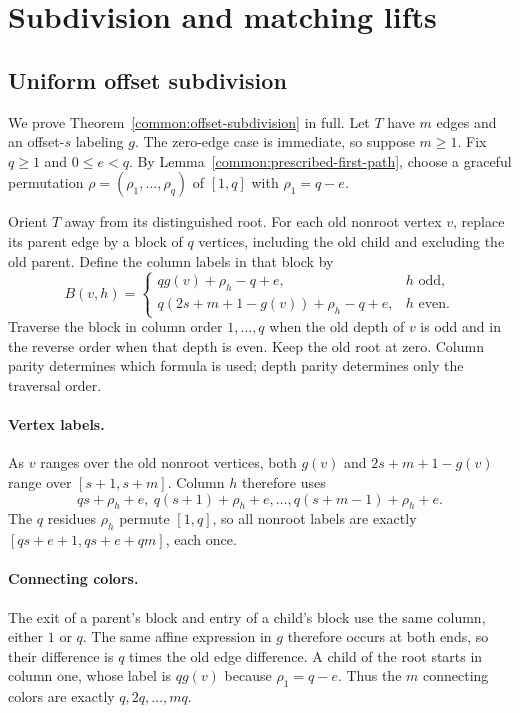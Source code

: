 \section{Subdivision and matching lifts}
\label{app:lifts}

\subsection{Uniform offset subdivision}\label{app:subdivision}
We prove Theorem~\ref{common:offset-subdivision} in full. Let $T$ have
$m$ edges and an offset-$s$ labeling $g$. The zero-edge case is
immediate, so suppose $m\ge1$. Fix $q\ge1$ and $0\le e<q$. By
Lemma~\ref{common:prescribed-first-path}, choose a graceful permutation
$\rho=(\rho_1,\ldots,\rho_q)$ of $[1,q]$ with $\rho_1=q-e$.

Orient $T$ away from its distinguished root. For each old nonroot
vertex $v$, replace its parent edge by a block of $q$ vertices,
including the old child and excluding the old parent. Define the column labels in that block by
\begin{equation}\label{eq:subdivision-columns}
 B(v,h)=\begin{cases}
 qg(v)+\rho_h-q+e,&h\text{ odd},\\
 q(2s+m+1-g(v))+\rho_h-q+e,&h\text{ even}.
 \end{cases}
\end{equation}
Traverse the block in column order $1,\ldots,q$ when the old depth of
$v$ is odd and in the reverse order when that depth is even. Keep the
old root at zero. Column parity determines which formula is used;
depth parity determines only the traversal order.

\paragraph{Vertex labels.}
As $v$ ranges over the old nonroot vertices, both $g(v)$ and
$2s+m+1-g(v)$ range over $[s+1,s+m]$. Column $h$ therefore uses
\[
 qs+\rho_h+e,\ q(s+1)+\rho_h+e,\ldots,
 q(s+m-1)+\rho_h+e.
\]
The $q$ residues $\rho_h$ permute $[1,q]$, so all nonroot labels are
exactly $[qs+e+1,qs+e+qm]$, each once.

\paragraph{Connecting colors.}
The exit of a parent's block and entry of a child's block use the
same column, either $1$ or $q$. The same affine expression in $g$
therefore occurs at both ends, so their difference is $q$ times the
old edge difference. A child of the root starts in column one, whose
label is $qg(v)$ because $\rho_1=q-e$. Thus the $m$ connecting colors
are exactly $q,2q,\ldots,mq$.

